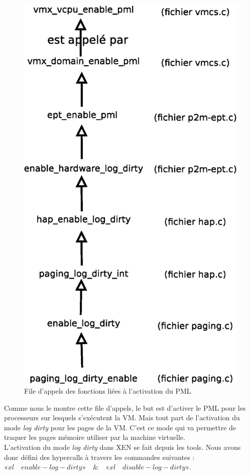 \begin{figure}[H]
    \centering
    \includegraphics[scale=.6]{chapters/4/fig4/appel_fonction}
    \caption{File d'appels des fonctions liées à l'activation du PML}
    \label{fig:appel_fonction}
\end{figure}

\noindent Comme nous le montre cette file d'appels, le but est d'activer le PML pour les processeurs sur lesquels s'exécutent la VM. Mais tout part de l'activation du mode \textit{log dirty} pour les pages de la VM. C'est ce mode qui va permettre de traquer les pages mémoire utiliser par la machine virtuelle.\\
L'activation du mode \textit{log dirty} dans XEN se fait depuis les tools. Nous avons donc défini des hypercalls à travers les commandes suivantes : $«xl \quad enable-log-dirty» \quad \& \quad  «xl \quad disable-log-dirty»$.

